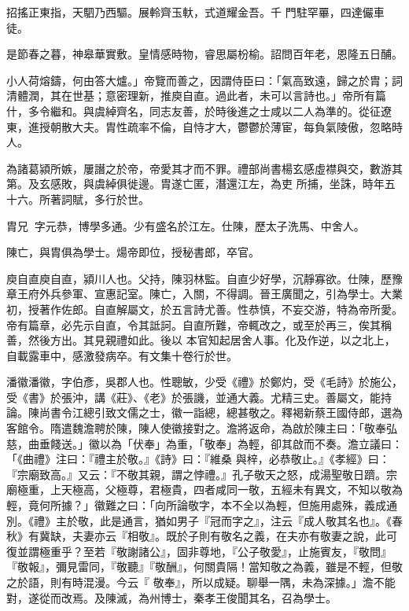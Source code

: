 \begin{pinyinscope}
 招搖正東指，天駟乃西驅。展軨齊玉軑，式道耀金吾。千
 門駐罕罼，四達儼車徒。



 是節春之暮，神皋華實敷。皇情感時物，睿思屬枌榆。詔問百年老，恩隆五日酺。



 小人荷熔鑄，何由答大爐。」帝覽而善之，因謂侍臣曰：「氣高致遠，歸之於胄；詞清體潤，其在世基；意密理新，推庾自直。過此者，未可以言詩也。」帝所有篇什，多令繼和。與虞綽齊名，同志友善，於時後進之士咸以二人為準的。從征遼東，進授朝散大夫。胄性疏率不倫，自恃才大，鬱鬱於薄宦，每負氣陵傲，忽略時人。



 為諸葛潁所嫉，屢譖之於帝，帝愛其才而不罪。禮部尚書楊玄感虛襟與交，數游其第。及玄感敗，與虞綽俱徙邊。胄遂亡匿，潛還江左，為吏
 所捕，坐誅，時年五十六。所著詞賦，多行於世。



 胄兄，字元恭，博學多通。少有盛名於江左。仕陳，歷太子洗馬、中舍人。



 陳亡，與胄俱為學士。煬帝即位，授秘書郎，卒官。



 庾自直庾自直，潁川人也。父持，陳羽林監。自直少好學，沉靜寡欲。仕陳，歷豫章王府外兵參軍、宣惠記室。陳亡，入關，不得調。晉王廣聞之，引為學士。大業初，授著作佐郎。自直解屬文，於五言詩尤善。性恭慎，不妄交游，特為帝所愛。帝有篇章，必先示自直，令其詆訶。自直所難，帝輒改之，或至於再三，俟其稱善，然後方出。其見親禮如此。後以
 本官知起居舍人事。化及作逆，以之北上，自載露車中，感激發病卒。有文集十卷行於世。



 潘徽潘徽，字伯彥，吳郡人也。性聰敏，少受《禮》於鄭灼，受《毛詩》於施公，受《書》於張沖，講《莊》、《老》於張譏，並通大義。尤精三史。善屬文，能持論。陳尚書令江總引致文儒之士，徽一詣總，總甚敬之。釋褐新蔡王國侍郎，選為客館令。隋遣魏澹聘於陳，陳人使徽接對之。澹將返命，為啟於陳主曰：「敬奉弘慈，曲垂餞送。」徽以為「伏奉」為重，「敬奉」為輕，卻其啟而不奏。澹立議曰：「《曲禮》注曰：『禮主於敬。』《詩》曰：『維桑
 與梓，必恭敬止。』《孝經》曰：『宗廟致高。』又云：『不敬其親，謂之悖禮。』孔子敬天之怒，成湯聖敬日躋。宗廟極重，上天極高，父極尊，君極貴，四者咸同一敬，五經未有異文，不知以敬為輕，竟何所據？」徽難之曰：「向所論敬字，本不全以為輕，但施用處殊，義成通別。《禮》主於敬，此是通言，猶如男子『冠而字之』，注云『成人敬其名也』。《春秋》有冀缺，夫妻亦云『相敬』。既於子則有敬名之義，在夫亦有敬妻之說，此可復並謂極重乎？至若『敬謝諸公』，固非尊地，『公子敬愛』，止施賓友，『敬問』『敬報』，彌見雷同，『敬聽』『敬酬』，何關貴隔！當知敬之為義，雖是不輕，但敬之於語，則有時混漫。今云『
 敬奉』，所以成疑。聊舉一隅，未為深據。」澹不能對，遂從而改焉。及陳滅，為州博士，秦孝王俊聞其名，召為學士。




\end{pinyinscope}
